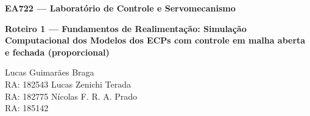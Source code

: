 {\LARGE\textbf{EA722 --- Laboratório de Controle e Servomecanismo}\par}
\vspace{1cm}
{\Large\textbf{Roteiro 1 --- Fundamentos de Realimentação: Simulação Computacional dos Modelos dos ECPs com controle em malha aberta e fechada (proporcional)}\par}
Lucas Guimarães Braga \\RA: 182543 \hfill Lucas Zenichi Terada \\RA: 182775 \hfill Nícolas F. R. A. Prado \\RA: 185142
\date{\today}